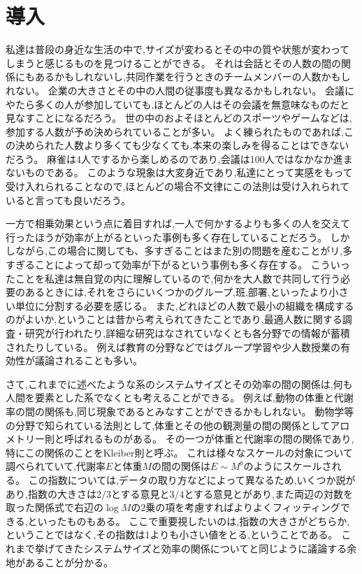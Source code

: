 \chapter{導入}

私達は普段の身近な生活の中で,サイズが変わるとその中の質や状態が変わってしまうと感じるものを見つけることができる。
それは会話とその人数の間の関係にもあるかもしれないし,共同作業を行うときのチームメンバーの人数かもしれない\cite{kaigi4}。
企業の大きさとその中の人間の従事度も異なるかもしれない。
会議にやたら多くの人が参加していても,ほとんどの人はその会議を無意味なものだと見なすことになるだろう。
世の中のおよそほとんどのスポーツやゲームなどは,参加する人数が予め決められていることが多い。
よく練られたものであれば,この決められた人数より多くても少なくても,本来の楽しみを得ることはできないだろう。
麻雀は4人でするから楽しめるのであり,会議は100人ではなかなか進まないものである。
このような現象は大変身近であり,私達にとって実感をもって受け入れられることなので,ほとんどの場合不文律にこの法則は受け入れられていると言っても良いだろう。

一方で相乗効果という点に着目すれば,一人で何かするよりも多くの人を交えて行ったほうが効率が上がるといった事例も多く存在していることだろう。
しかしながら,この場合に関しても、多すぎることはまた別の問題を産むことがリ,多すぎることによって却って効率が下がるという事例も多く存在する。
こういったことを私達は無自覚の内に理解しているので,何かを大人数で共同して行う必要のあるときには,それをさらにいくつかのグループ,班,部署,といったより小さい単位に分割する必要を感じる。
また,どれほどの人数で最小の組織を構成するのがよいか,ということは昔から考えられてきたことであり,最適人数に関する調査・研究が行われたり,詳細な研究はなされていなくとも各分野での情報が蓄積されたりしている。
例えば教育の分野などではグループ学習や少人数授業の有効性が議論されることも多い。

さて,これまでに述べたような系のシステムサイズとその効率の間の関係は,何も人間を要素とした系でなくとも考えることができる。
例えば,動物の体重と代謝率の間の関係も,同じ現象であるとみなすことができるかもしれない。
動物学等の分野で知られている法則として,体重とその他の観測量の間の関係としてアロメトリー則と呼ばれるものがある。
その一つが体重と代謝率の間の関係であり,特にこの関係のことをKleiber則と呼ぶ。
これは様々なスケールの対象について調べられていて,代謝率$E$と体重$M$の間の関係は$E\sim M^{b}$のようにスケールされる。
この指数については,データの取り方などによって異なるため,いくつか説があり,指数の大きさは$2/3$とする意見と$3/4$とする意見とがあり,また両辺の対数を取った関係式で右辺の$\log M$の2乗の項を考慮すればよりよくフィッティングできる,といったものもある。
ここで重要視したいのは,指数の大きさがどちらか,ということではなく,その指数は1よりも小さい値をとる,ということである。
これまで挙げてきたシステムサイズと効率の関係についてと同じように議論する余地があることが分かる。

